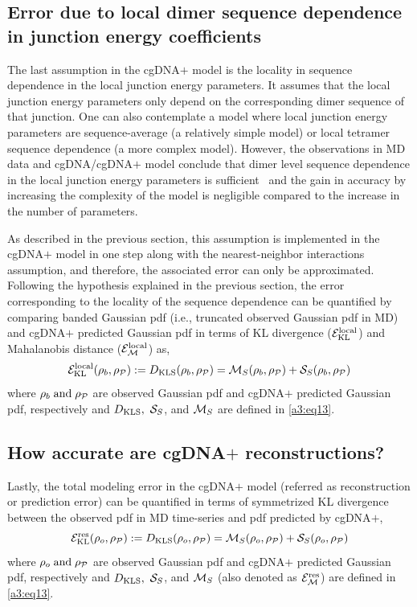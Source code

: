 \subsection{Error due to local dimer sequence dependence in junction energy coefficients}\label{c2:s5sb23_local}
The last assumption in the cgDNA$+$ model is the locality in sequence dependence in the local junction energy parameters.
It assumes that the local junction energy parameters only depend on the corresponding dimer sequence of that junction.
One can also contemplate a model where local junction energy parameters are sequence-average (a relatively simple model) or local tetramer sequence dependence (a more complex model). 
However, the observations in MD data and cgDNA/cgDNA$+$ model conclude that dimer level sequence dependence in the local junction energy parameters is sufficient~\cite{cgDNA1,petkevivciute2014cgdna,patelithesis} and the gain in accuracy by increasing the complexity of the model is negligible compared to the increase in the number of parameters. 

As described in the previous section, this assumption is implemented in the cgDNA$+$ model in one step along with the nearest-neighbor interactions assumption, and therefore, the associated error can only be approximated. 
Following the hypothesis explained in the previous section, the error corresponding to the locality of the sequence dependence can be quantified by comparing banded Gaussian pdf (i.e., truncated observed Gaussian pdf in MD) and cgDNA$+$ predicted Gaussian pdf in terms of KL divergence ($\er_{\text{KL}}^{\text{local}}$) and Mahalanobis distance ($\er_{\M}^{\text{local}}$) as,
\begin{equation}
\er_{\text{KL}}^{\text{local}}(\rho_b,\rho_{\Pc}) := D_{\text{KLS}}(\rho_b,\rho_{\Pc}) = \M_{S}(\rho_b,\rho_{\Pc}) + \S_{S}(\rho_b,\rho_{\Pc})
\label{error4local}
\end{equation}
where $\rho_b \and \rho_{\Pc}$ are observed Gaussian pdf and cgDNA$+$ predicted Gaussian pdf, respectively and $D_{\text{KLS}}, \ \S_S$, and $\M_S$ are defined in \cref{a3:eq13}. 

\subsection{How accurate are cgDNA$+$ reconstructions?}\label{c2:s5sb3}
Lastly, the total modeling error in the cgDNA$+$ model (referred as reconstruction or prediction error) can be quantified in terms of symmetrized KL divergence between the observed pdf in MD time-series and pdf predicted by cgDNA$+$,
\begin{equation}
\er_{\text{KL}}^{\text{res}}(\rho_o,\rho_{\Pc}) := D_{\text{KLS}}(\rho_o,\rho_{\Pc}) = \M_{S}(\rho_o,\rho_{\Pc}) + \S_{S}(\rho_o,\rho_{\Pc}) 
\label{error4band}
\end{equation}
where $\rho_o \and \rho_{\Pc}$ are observed Gaussian pdf and cgDNA$+$ predicted Gaussian pdf, respectively and $D_{\text{KLS}}, \ \S_S$, and $\M_S$ (also denoted as $\er_{\M}^{\text{res}}$) are defined in \cref{a3:eq13}. 

